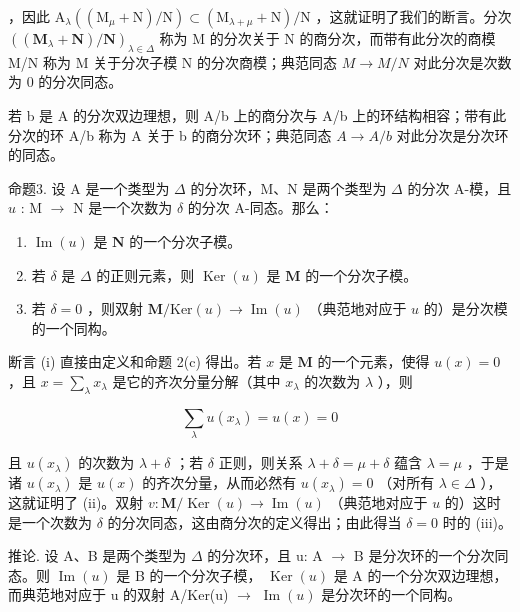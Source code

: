 ，因此 \(\mathrm{A}_{\lambda}((\mathrm{M}_{\mu}+\mathrm{N})/\mathrm{N})\subset(\mathrm{M}_{\lambda+\mu}+\mathrm{N})/\mathrm{N}\) ，这就证明了我们的断言。分次 \(((\mathbf{M}_{\lambda} + \mathbf{N})/\mathbf{N})_{\lambda \in \Delta}\) 称为 M 的分次关于 N 的商分次，而带有此分次的商模 M/N 称为 M 关于分次子模 N 的分次商模；典范同态 \(M \to M/N\) 对此分次是次数为 0 的分次同态。

若 b 是 A 的分次双边理想，则 A/b 上的商分次与 A/b 上的环结构相容；带有此分次的环 A/b 称为 A 关于 b 的商分次环；典范同态 \(A \rightarrow A/b\) 对此分次是分次环的同态。

命题3. 设 A 是一个类型为 \(\Delta\) 的分次环，M、N 是两个类型为 \(\Delta\) 的分次 A-模，且 \(u\) : M \(\rightarrow\) N 是一个次数为 \(\delta\) 的分次 A-同态。那么：

\begin{enumerate}
\def\labelenumi{(\roman{enumi})}
\item
  \(\operatorname{Im}(u)\) 是 \(\mathbf{N}\) 的一个分次子模。
\item
  若 \(\delta\) 是 \(\Delta\) 的正则元素，则 \(\operatorname{Ker}(u)\) 是 \(\mathbf{M}\) 的一个分次子模。
\item
  若 \(\delta = 0\) ，则双射 \(\mathbf{M} / \mathrm{Ker}(u) \to \operatorname{Im}(u)\) （典范地对应于 \(u\) 的）是分次模的一个同构。
\end{enumerate}

断言 (i) 直接由定义和命题 2(c) 得出。若 \(x\) 是 \(\mathbf{M}\) 的一个元素，使得 \(u(x) = 0\) ，且 \(x = \sum_{\lambda} x_{\lambda}\) 是它的齐次分量分解（其中 \(x_{\lambda}\) 的次数为 \(\lambda\) ），则

\[
\sum_ {\lambda} u (x _ {\lambda}) = u (x) = 0
\]

且 \(u(x_{\lambda})\) 的次数为 \(\lambda + \delta\) ；若 \(\delta\) 正则，则关系 \(\lambda + \delta = \mu + \delta\) 蕴含 \(\lambda = \mu\) ，于是诸 \(u(x_{\lambda})\) 是 \(u(x)\) 的齐次分量，从而必然有 \(u(x_{\lambda}) = 0\) （对所有 \(\lambda \in \Delta\) ），这就证明了 (ii)。双射 \(v: \mathbf{M} / \operatorname{Ker}(u) \to \operatorname{Im}(u)\) （典范地对应于 \(u\) 的）这时是一个次数为 \(\delta\) 的分次同态，这由商分次的定义得出；由此得当 \(\delta = 0\) 时的 (iii)。

推论. 设 A、B 是两个类型为 \(\Delta\) 的分次环，且 u: A \(\rightarrow\) B 是分次环的一个分次同态。则 \(\operatorname{Im}(u)\) 是 B 的一个分次子模， \(\operatorname{Ker}(u)\) 是 A 的一个分次双边理想，而典范地对应于 u 的双射 A/Ker(u) \(\rightarrow\) \(\operatorname{Im}(u)\) 是分次环的一个同构。

